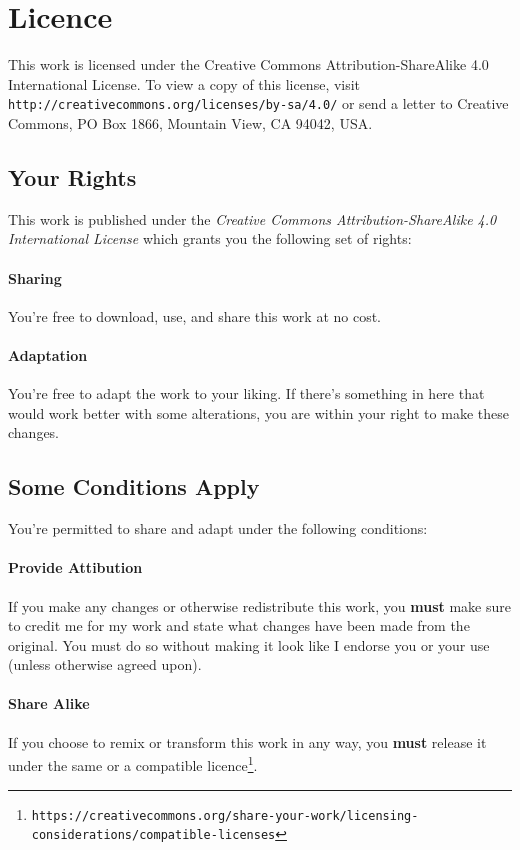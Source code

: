 \documentclass[a4paper]{book}
\begin{document}
\section*{Licence}
This work is licensed under the Creative Commons Attribution-ShareAlike 4.0 International License.
To view a copy of this license, visit \texttt{http://creativecommons.org/licenses/by-sa/4.0/} or send a letter to Creative Commons, PO Box 1866, Mountain View, CA 94042, USA.

\subsection*{Your Rights}
This work is published under the \textit{Creative Commons Attribution-ShareAlike 4.0 International License} which grants you the following set of rights:
\paragraph{Sharing} You're free to download, use, and share this work at no cost.
\paragraph{Adaptation} You're free to adapt the work to your liking. 
If there's something in here that would work better with some alterations, you are within your right to make these changes.

\subsection*{Some Conditions Apply}
You're permitted to share and adapt under the following conditions:
\paragraph{Provide Attibution} If you make any changes or otherwise redistribute this work, you \textbf{must} make sure to credit me for my work and state what changes have been made from the original.
You must do so without making it look like I endorse you or your use (unless otherwise agreed upon).
\paragraph{Share Alike} If you choose to remix or transform this work in any way, you \textbf{must} release it under the same or a compatible licence\footnote{\texttt{https://creativecommons.org/share-your-work/licensing-considerations/compatible-licenses}}.

\tableofcontents
\mainmatter %










\appendix

\end{document}

